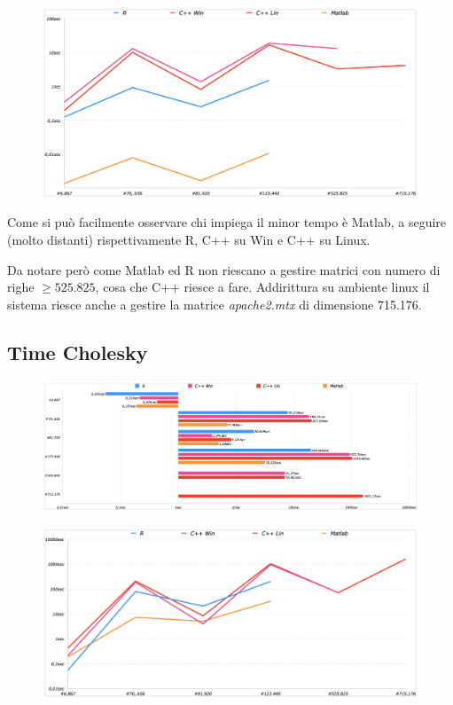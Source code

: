 \documentclass[preprint,12pt]{elsarticle}
\begin{document}
\begin{figure}[H]
	\centering
	\includegraphics[width=\linewidth]{setup2}
\end{figure}

Come si può facilmente osservare chi impiega il minor tempo è Matlab, a seguire (molto distanti) rispettivamente R, C++ su Win e C++ su Linux.


Da notare però come Matlab ed R non riescano a gestire matrici con numero di righe $\geq 525.825$, cosa che C++ riesce a fare. Addirittura su ambiente linux il sistema riesce anche a gestire la matrice \textit{apache2.mtx} di dimensione 715.176.

\subsection*{Time Cholesky}

\begin{figure}[H]
	\centering
	\includegraphics[width=\linewidth]{cholesky1}
\end{figure}

\begin{figure}[H]
	\centering
	\includegraphics[width=\linewidth]{cholesky2}
\end{figure}
\end{document}
